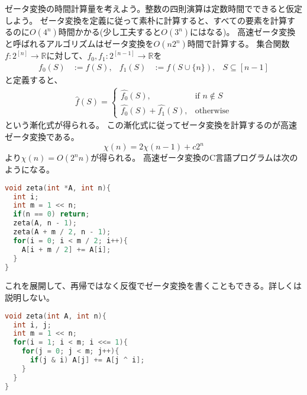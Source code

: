 \documentclass[a4paper,twoside,onecolumn,openany,article,10pt]{memoir}
\theoremstyle{definition}
\theoremstyle{remark}
\begin{document}
ゼータ変換の時間計算量を考えよう。整数の四則演算は定数時間でできると仮定しよう。
ゼータ変換を定義に従って素朴に計算すると、すべての要素を計算するのに$O(4^n)$時間かかる(少し工夫すると$O(3^n)$にはなる)。
高速ゼータ変換と呼ばれるアルゴリズムはゼータ変換を$O(n 2^n)$時間で計算する。
集合関数$f\colon 2^{[n]}\to\mathbb{R}$に対して、$f_0, f_1\colon 2^{[n-1]}\to\mathbb{R}$を
\begin{align*}
f_0(S) &:= f(S), & f_1(S) &:= f(S\cup\{n\}),& S\subseteq[n-1]
\end{align*}
と定義すると、
\begin{align*}
\widehat{f}(S) =
\begin{cases}
\widehat{f_0}(S),&\text{if } n\notin S\\
\widehat{f_0}(S)+\widehat{f_1}(S),&\text{otherwise}
\end{cases}
\end{align*}
という漸化式が得られる。
この漸化式に従ってゼータ変換を計算するのが高速ゼータ変換である。
\begin{equation*}
\chi(n) = 2\chi(n-1) + c2^n
\end{equation*}
より$\chi(n) = O(2^n n)$が得られる。
高速ゼータ変換のC言語プログラムは次のようになる。
\begin{lstlisting}[basicstyle=\ttfamily\normalsize,showstringspaces=false,language=C,frame=single]
void zeta(int *A, int n){
  int i;
  int m = 1 << n;
  if(n == 0) return;
  zeta(A, n - 1);
  zeta(A + m / 2, n - 1);
  for(i = 0; i < m / 2; i++){
    A[i + m / 2] += A[i];
  }
}
\end{lstlisting}
これを展開して、再帰ではなく反復でゼータ変換を書くこともできる。詳しくは説明しない。
\begin{lstlisting}[basicstyle=\ttfamily\normalsize,showstringspaces=false,language=C,frame=single]
void zeta(int A, int n){
  int i, j;
  int m = 1 << n;
  for(i = 1; i < m; i <<= 1){
    for(j = 0; j < m; j++){
      if(j & i) A[j] += A[j ^ i];
    }
  }
}
\end{lstlisting}
\end{document}
